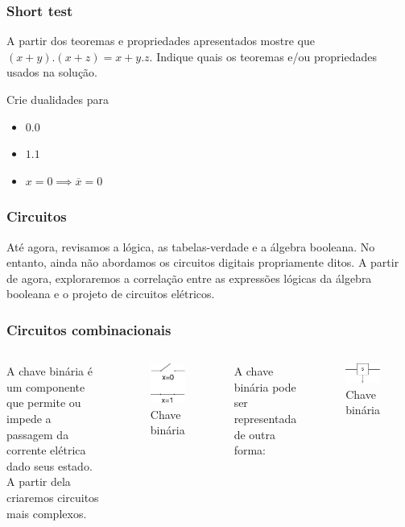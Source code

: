 \begin{frame}
	\frametitle{Short test}
	\par A partir dos teoremas e propriedades apresentados mostre que $(x+y).(x+z)=x+y.z$. Indique quais os teoremas e/ou propriedades usados na solução.\newline
	\par Crie dualidades para
	\begin{itemize}
		\item $0.0$
		\item $1.1$
		\item $x=0 \implies \overline{x}=0$
	\end{itemize}
\end{frame}

\begin{frame}
	\frametitle{Circuitos}
	\par Até agora, revisamos a lógica, as tabelas-verdade e a álgebra booleana. No entanto, ainda não abordamos os circuitos digitais propriamente ditos. A partir de agora, exploraremos a correlação entre as expressões lógicas da álgebra booleana e o projeto de circuitos elétricos.
\end{frame}

\begin{frame}
	\frametitle{Circuitos combinacionais}
	\begin{columns}
		\par A chave binária é um componente que permite ou impede a passagem da corrente elétrica dado seus estado. A partir dela criaremos circuitos mais complexos.
		\begin{figure}
			\centering
			\includegraphics[width=0.2\linewidth]{images/chaveBinaria}
			\caption{Chave binária}
			\label{fig:chavebinaria}
		\end{figure}
		\par A chave binária pode ser representada de outra forma:
		\begin{figure}
			\centering
			\includegraphics[width=0.7\linewidth]{images/chaveBinariaAbstrata}
			\caption{Chave binária}
			\label{fig:chavebinariaabstrata}
		\end{figure}
	\end{columns}
\end{frame}


